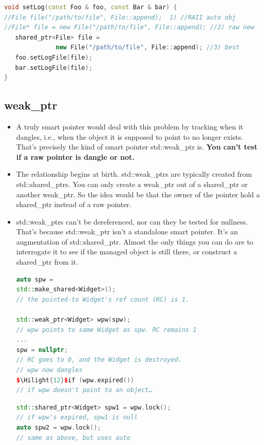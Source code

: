 \documentclass[a4paper,12pt,twoside]{book}
\newcommand{\Hilight}[1]{\makebox[0pt][l]{\color{yellow}\rule[-3pt]{#1em}{11pt}}}
\begin{document}
\begin{itemize}
\begin{lstlisting}[frame=single, language=c++]
void setLog(const Foo & foo, const Bar & bar) {
//File file("/path/to/file", File::append);  1) //RAII auto obj
//File* file = new File("/path/to/file", File::append); //2) raw new
   shared_ptr<File> file =
              new File("/path/to/file", File::append); //3) best
   foo.setLogFile(file);
   bar.setLogFile(file);
}
\end{lstlisting}

\end{itemize}


\subsection{weak\_ptr}
\begin{itemize}
\item A truly smart pointer would deal with this problem by tracking
when it dangles, i.e., when the object it is supposed to point to no longer exists. That's
precisely the kind of smart pointer std::weak\_ptr is. \textbf{You can't test if a raw pointer is dangle or not.}

\item The relationship begins at birth. std::weak\_ptrs are typically created from std::shared\_ptrs. You can only create a weak\_ptr out of a shared\_ptr or another weak\_ptr. So the idea would be that the owner of the pointer hold a shared\_ptr instead of a raw pointer.

\item std::weak\_ptrs can't be dereferenced, nor can they be tested for nullness. That's because std::weak\_ptr isn't a standalone smart pointer. It's an augmentation of std::shared\_ptr. Almost the only things you can do are to interrogate it to see if the managed object is still there, or construct a shared\_ptr from it.

\begin{lstlisting}[frame=single, language=c++,mathescape=true]
auto spw =
std::make_shared<Widget>();
// the pointed-to Widget's ref count (RC) is 1.

std::weak_ptr<Widget> wpw(spw);
// wpw points to same Widget as spw. RC remains 1
...
spw = nullptr;
// RC goes to 0, and the Widget is destroyed.
// wpw now dangles
$\Hilight{12}$if (wpw.expired())
// if wpw doesn't point to an object…
\end{lstlisting}

\begin{lstlisting}[frame=single, language=c++,mathescape=true]
std::shared_ptr<Widget> spw1 = wpw.lock();
// if wpw's expired, spw1 is null
auto spw2 = wpw.lock();
// same as above, but uses auto


\end{lstlisting}
\end{itemize}
\end{document}

